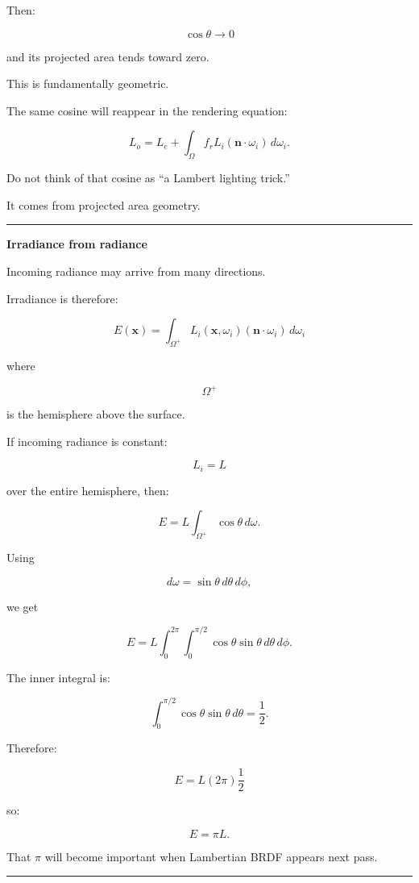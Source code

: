 Then:

\[
\cos\theta\rightarrow0
\]

and its projected area tends toward zero.

This is fundamentally geometric.

The same cosine will reappear in the rendering equation:

\[
L_o=
L_e+
\int_\Omega
f_r
L_i
(\mathbf n\cdot\omega_i)
\,d\omega_i.
\]

Do not think of that cosine as ``a Lambert lighting trick.''

It comes from projected area geometry.

\begin{center}\rule{0.5\linewidth}{0.5pt}\end{center}

\textbf{Irradiance from radiance}

Incoming radiance may arrive from many directions.

Irradiance is therefore:

\[
\boxed{
E(\mathbf x)
=
\int_{\Omega^+}
L_i(\mathbf x,\omega_i)
(\mathbf n\cdot\omega_i)
\,d\omega_i
}
\]

where

\[
\Omega^+
\]

is the hemisphere above the surface.

If incoming radiance is constant:

\[
L_i=L
\]

over the entire hemisphere, then:

\[
E=
L
\int_{\Omega^+}\cos\theta\,d\omega.
\]

Using

\[
d\omega=\sin\theta\,d\theta\,d\phi,
\]

we get

\[
E=
L
\int_0^{2\pi}
\int_0^{\pi/2}
\cos\theta\sin\theta
\,d\theta\,d\phi.
\]

The inner integral is:

\[
\int_0^{\pi/2}
\cos\theta\sin\theta\,d\theta
=
\frac12.
\]

Therefore:

\[
E=
L(2\pi)\frac12
\]

so:

\[
\boxed{
E=\pi L.
}
\]

That \(\pi\) will become important when Lambertian BRDF appears next pass.

\begin{center}\rule{0.5\linewidth}{0.5pt}\end{center}

